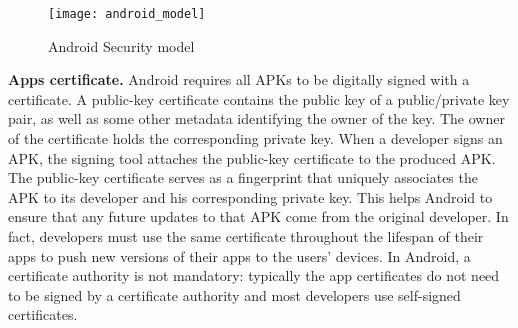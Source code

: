 \begin{figure}[H]
\centering
\texttt{[image: android\_model]}
\caption{Android Security model}
\label{fig:androidmodel}
\end{figure}



\textbf{Apps certificate.}  Android requires  all APKs to be digitally signed with a certificate. A public-key certificate contains the public key of a public/private key pair, as well as some other metadata identifying the owner of the key. The owner of the certificate holds the corresponding private key. When a developer signs an APK, the signing tool attaches the public-key certificate to the produced APK. The public-key certificate serves as a fingerprint that uniquely associates the APK to its developer and his corresponding private key. This helps Android to ensure that any future updates to that APK  come from the original developer. In fact, developers must use the same certificate throughout the lifespan of their apps to push new versions of their apps to the users' devices. In Android, a certificate authority is not mandatory: typically the app certificates do not need to be signed by a certificate authority and most developers use self-signed certificates.




